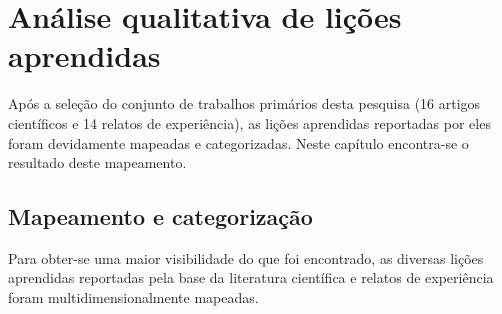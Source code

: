 \chapter{Análise qualitativa de lições aprendidas}
	Após a seleção do conjunto de trabalhos primários desta pesquisa (16 artigos científicos e 14 relatos de experiência), as lições aprendidas reportadas por eles foram devidamente mapeadas e categorizadas. Neste capítulo encontra-se o resultado deste mapeamento.
	\section{Mapeamento e categorização}
		Para obter-se uma maior visibilidade do que foi encontrado, as diversas lições aprendidas reportadas pela base da literatura científica e relatos de experiência foram multidimensionalmente mapeadas. 
		
